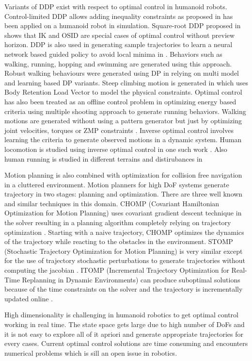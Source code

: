 Variants of DDP exist with respect to optimal control in humanoid robots. Control-limited DDP allows adding inequality constraints as proposed in \cite{tassa2014control}  has been applied on a humanoid robot in simulation. Square-root DDP proposed in \cite{geoffroy2014inverse} shows that IK and OSID are special cases of optimal control without preview horizon. DDP is also used in generating sample trajectories to learn a neural network based guided policy to avoid local minima in \cite{Levine2012}. Behaviors such as walking, running, hopping and swimming are generated using this approach. Robust walking behaviours were generated using DP in \cite{whitman2013coordination} relying on multi model and learning based DP variants. Steep climbing motion is generated in \cite{Noda2014}
which uses Body Retention Load Vector to model the physical constraints. Optimal control has also been treated as an offline control problem in \cite{schultz2010modeling} optimizing energy based criteria using multiple shooting approach to generate running behaviors. Walking motions are generated without using a pattern generator but just by optimizing joint velocities, torques or ZMP constraints \cite{el2013optimal,koch2012studying}. Inverse optimal control involves learning the criteria to generate observed motions in a dynamic system. Human locomotion is studied using inverse optimal control in one such work \cite{mombaur2010human}. Also human running is studied in different terrains and distirubances in \cite{park2013inverse}


Motion planning is also combined with optimization for collision free navigation in a cluttered environment. Motion planners for high DoF systems generate trajectory in two stages: planning and optimization. There are three well known and similar techniques in this domain. CHOMP (Covariant Hamiltonian Optimization for Motion Planning) uses covariant gradient descent technique in the solver resulting in a planning algorithm completely relying on trajectory optimization \cite{zucker2013chomp}. Starting with a naive trajectory, CHOMP optimizes the dynamics of the trajectory while reacting to the obstacles in the environment. STOMP (Stochastic Trajectory Optimization for Motion Planning) is very similar except for the use of trajectory stochastic perturbations to generate trajectories without computing the jacobian \cite{kalakrishnan2011stomp}. ITOMP (Incremental Trajectory Optimization for Real-Time Replanning in Dynamic Environments) can produce suboptimal solutions because of the time constraints on the solver and the trajectory is incrementally updated online \cite{park2014high}.

High dimensionality is challenging in humanoid robotics to get optimal control working in real time. The state space gets large due to high number of DoFs and it is not easy to explore all of it apriori and generate appropriate trajectories for every cases. Current optimal control solutions are time consuming and encounters numerical problems which is sill an open issue in robotics.